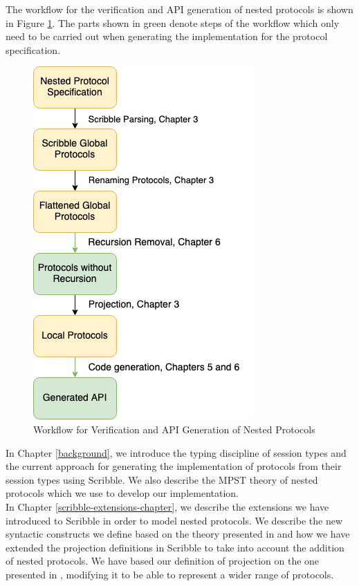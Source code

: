 \documentclass[12pt,twoside]{report}
\begin{document}
The workflow for the verification and API generation of nested protocols is shown in Figure \ref{project-pipeline}. The parts shown in green denote steps of the workflow which only need to be carried out when generating the implementation for the protocol specification.\\

\begin{figure}
    \centering
    \includegraphics[scale=0.75]{figures/pipeline.png}
    \caption{Workflow for Verification and API Generation of Nested Protocols}
    \label{project-pipeline}
\end{figure}

In Chapter \ref{background}, we introduce the typing discipline of session types and the current approach for generating the implementation of protocols from their session types using Scribble\cite{scribble}. We also describe the MPST theory of nested protocols which we use to develop our implementation.\\

In Chapter \ref{scribble-extensions-chapter}, we describe the extensions we have introduced to Scribble\cite{featherweight} in order to model nested protocols. We describe the new syntactic constructs we define based on the theory presented in \cite{nestedprotocols} and how we have extended the projection definitions in Scribble to take into account the addition of nested protocols. We have based our definition of projection on the one presented in \cite{nestedprotocols}, modifying it to be able to represent a wider range of protocols.\\
\end{document}
